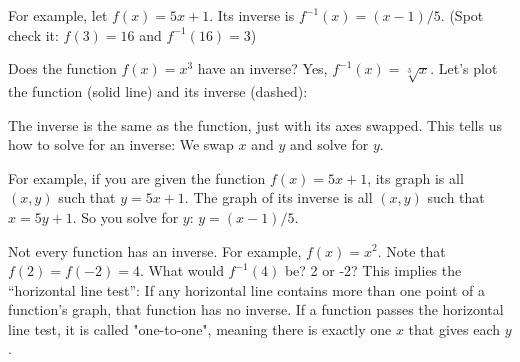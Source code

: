 For example, let $f(x) = 5x + 1$. Its inverse is
$f^{-1}(x) = (x - 1)/5$. (Spot check it: $f(3) = 16$ and $f^{-1}(16) = 3$)

Does the function $f(x) = x^3$ have an inverse? Yes, $f^{-1}(x) =
\sqrt[3]{x}$. Let's plot the function (solid line) and its inverse (dashed):


The inverse is the same as the function, just with its axes swapped.
This tells us how to solve for an inverse: We swap $x$ and $y$ and
solve for $y$.

For example, if you are given the function $f(x) = 5x + 1$, its graph
is all $(x,y)$ such that $y = 5x + 1$.  The graph of its inverse is
all $(x, y)$ such that $x = 5y + 1$. So you solve for $y$: $y = (x -
1)/5$.

Not every function has an inverse.  For example, $f(x) = x^2$.  Note
that $f(2) = f(-2) = 4$.  What would $f^{-1}(4)$ be? 2 or -2?  This
implies the ``horizontal line test'': If any horizontal line contains
more than one point of a function's graph, that function has no
inverse. If a function passes the horizontal line test, it is called 
"one-to-one", meaning there is exactly one $x$ that gives each $y$. \\

